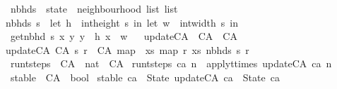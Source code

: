 \begin{isabellebody}
\isanewline
{}\isamarkupfalse%
\ nbhds\ {\isacharcolon}{\isacharcolon}\ {\isachardoublequoteopen}state\ {\isasymRightarrow}\ neighbourhood\ list\ list{\isachardoublequoteclose}\ \isanewline
{\isachardoublequoteopen}nbhds\ s\ {\isacharequal}\ {\isacharparenleft}let\ h\ {\isacharequal}\ {\isacharparenleft}int{\isacharunderscore}height\ s{\isacharparenright}{\isacharminus}{}\ in\ {\isacharparenleft}let\ w\ {\isacharequal}\ {\isacharparenleft}int{\isacharunderscore}width\ s{\isacharparenright}{\isacharminus}{}\ in\isanewline
\ {\isacharbrackleft}{\isacharbrackleft}get{\isacharunderscore}nbhd\ s\ x\ y{\isachardot}\ y\ {\isasymleftarrow}\ {\isacharbrackleft}{}{\isachardot}{\isachardot}h{\isacharbrackright}{\isacharbrackright}{\isachardot}\ x\ {\isasymleftarrow}\ {\isacharbrackleft}{}{\isachardot}{\isachardot}w{\isacharbrackright}{\isacharbrackright}{\isacharparenright}{\isacharparenright}{\isachardoublequoteclose}\isanewline
\isanewline
\ \isanewline
{}\isamarkupfalse%
\ update{\isacharunderscore}CA\ {\isacharcolon}{\isacharcolon}\ {\isachardoublequoteopen}CA\ {\isasymRightarrow}\ CA{\isachardoublequoteclose}\ \isanewline
{\isachardoublequoteopen}update{\isacharunderscore}CA\ {\isacharparenleft}CA\ s\ r{\isacharparenright}\ {\isacharequal}\ CA\ {\isacharparenleft}map\ {\isacharparenleft}{\isasymlambda}\ xs{\isachardot}\ map\ r\ xs{\isacharparenright}\ {\isacharparenleft}nbhds\ s{\isacharparenright}{\isacharparenright}\ r{\isachardoublequoteclose}\isanewline
\isanewline
{}\isamarkupfalse%
\ run{\isacharunderscore}t{\isacharunderscore}steps\ {\isacharcolon}{\isacharcolon}\ {\isachardoublequoteopen}CA\ {\isasymRightarrow}\ nat\ {\isasymRightarrow}\ CA{\isachardoublequoteclose}\ \isanewline
{\isachardoublequoteopen}run{\isacharunderscore}t{\isacharunderscore}steps\ ca\ n\ {\isacharequal}\ apply{\isacharunderscore}t{\isacharunderscore}times\ update{\isacharunderscore}CA\ ca\ n{\isachardoublequoteclose}%
\isadelimdocument
%
\endisadelimdocument
%
\isatagdocument
%
\isamarkuptrue%
%
\endisatagdocument
{\isafolddocument}%
%
\isadelimdocument
%
\endisadelimdocument
{}\isamarkupfalse%
\ stable\ {\isacharcolon}{\isacharcolon}\ {\isachardoublequoteopen}CA\ {\isasymRightarrow}\ bool{\isachardoublequoteclose}\ \isanewline
{\isachardoublequoteopen}stable\ ca\ {\isasymequiv}\ State\ {\isacharparenleft}update{\isacharunderscore}CA\ ca{\isacharparenright}\ {\isacharequal}\ State\ ca{\isachardoublequoteclose}\isanewline

\end{isabellebody}
